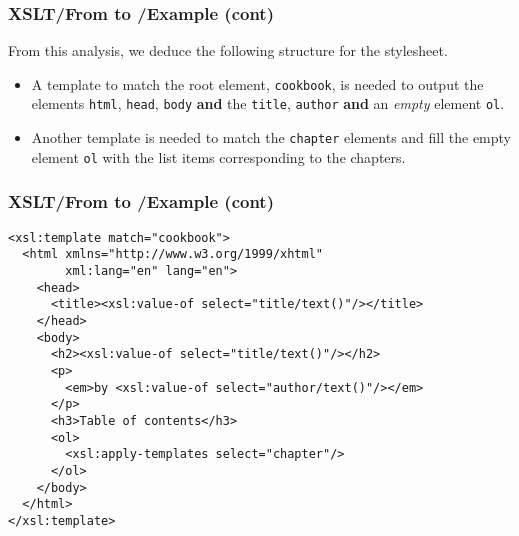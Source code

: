 %
\begin{frame}
\frametitle{XSLT/From \XML to \XHTML{}/Example (cont)}

From this analysis, we deduce the following structure for the \XSLT
stylesheet.
\begin{itemize}

  \item A template to match the root element, \texttt{cookbook}, is
    needed to output the \XHTML elements \texttt{html}, \texttt{head},
    \texttt{body} \textbf{and} the \texttt{title}, \texttt{author}
    \textbf{and} an \emph{empty} \XHTML element \texttt{ol}.

  \item Another template is needed to match the \texttt{chapter}
    elements and fill the empty \XHTML element \texttt{ol} with the
    list items corresponding to the chapters.

\end{itemize}

\end{frame}

%
\begin{frame}[containsverbatim]
\frametitle{XSLT/From \XML to \XHTML{}/Example (cont)}

{\small
\begin{verbatim}
<xsl:template match="cookbook">
  <html xmlns="http://www.w3.org/1999/xhtml"
        xml:lang="en" lang="en">
    <head>
      <title><xsl:value-of select="title/text()"/></title>
    </head>
    <body>
      <h2><xsl:value-of select="title/text()"/></h2>
      <p>
        <em>by <xsl:value-of select="author/text()"/></em>
      </p>
      <h3>Table of contents</h3>
      <ol>
        <xsl:apply-templates select="chapter"/>
      </ol>
    </body>
  </html>
</xsl:template>
\end{verbatim}
}

\end{frame}

